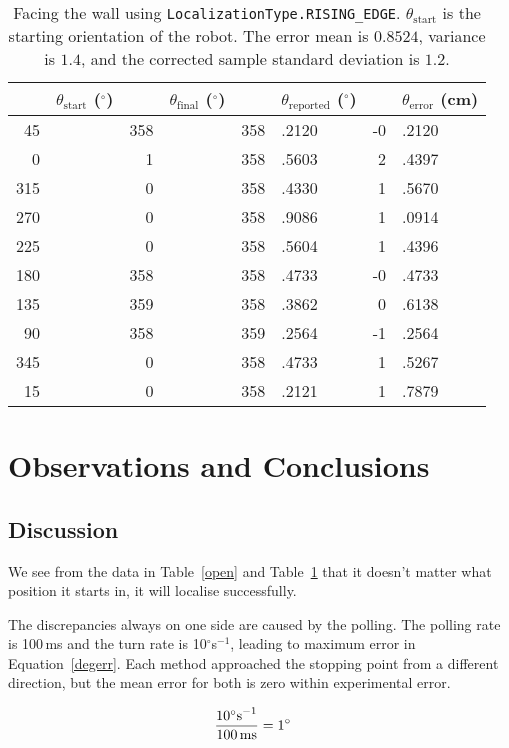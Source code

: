 \documentclass[twocolumn]{article}
\def\degree{\ensuremath{^\circ}}
\begin{document}
\begin{table*}[htb]
\begin{center}\begin{tabular}{r@{}l r@{}l r@{}l r@{}l}
&$\theta_{\text{start}}$ (\degree)& &$\theta_{\text{final}}$ (\degree)& &$\theta_{\text{reported}}$ (\degree)& &$\theta_{\text{error}}$ (cm) \\
\hline
45&& 358&& 358&.2120& -0&.2120 \\
0&& 1&& 358&.5603& 2&.4397 \\
315&& 0&& 358&.4330& 1&.5670 \\
270&& 0&& 358&.9086& 1&.0914 \\
225&& 0&& 358&.5604& 1&.4396 \\
180&& 358&& 358&.4733& -0&.4733 \\
135&& 359&& 358&.3862& 0&.6138 \\
90&& 358&& 359&.2564& -1&.2564 \\
345&& 0&& 358&.4733& 1&.5267 \\
15&& 0&& 358&.2121& 1&.7879 \\
\end{tabular}\end{center}
\caption{Facing the wall using {\tt LocalizationType.RISING\_EDGE}.
$\theta_{\text{start}}$ is the starting orientation of the robot.
The error mean is $0.8524$, variance is %
$1.4$, and the corrected sample standard deviation is %
$1.2$.}
\label{wall}
\end{table*}

\section{Observations and Conclusions}

\subsection{Discussion}

We see from the data in Table~\ref{open} and Table~\ref{wall} that it doesn't matter what position it starts in, it will localise successfully.

The discrepancies always on one side are caused by the polling. The polling rate is 100\,ms and the turn rate is 10\degree s$^{-1}$, leading to maximum error in Equation~\ref{degerr}. Each method approached the stopping point from a different direction, but the mean error for both is zero within experimental error.

\begin{align}
\frac{10\text{\degree s}^{-1}}{100\text{\,ms}} &= 1\degree\label{degerr}
\end{align}
\end{document}
